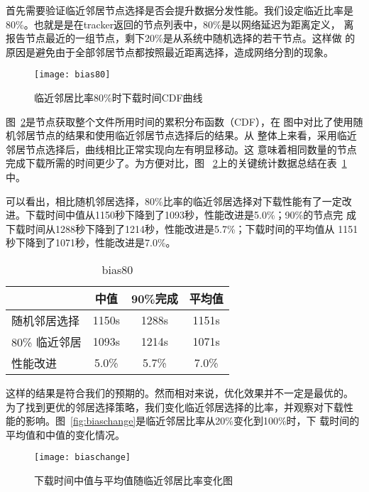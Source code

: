 首先需要验证临近邻居节点选择是否会提升数据分发性能。我们设定临近比率是
80\%。也就是是在tracker返回的节点列表中，80\%是以网络延迟为距离定义，
离报告节点最近的一组节点，剩下20\%是从系统中随机选择的若干节点。这样做
的原因是避免由于全部邻居节点都按照最近距离选择，造成网络分割的现象。

\begin{figure}
  \centering
  \begin{minipage}{0.8\linewidth}
    \centering
    \texttt{[image: bias80]}
    \caption{临近邻居比率80\%时下载时间CDF曲线}
    \label{fig:bias80}
  \end{minipage}
\end{figure}

图~\ref{fig:bias80}是节点获取整个文件所用时间的累积分布函数（CDF），在
图中对比了使用随机邻居节点的结果和使用临近邻居节点选择后的结果。从
整体上来看，采用临近邻居节点选择后，曲线相比正常实现向左有明显移动。这
意味着相同数量的节点完成下载所需的时间更少了。为方便对比，图~
\ref{fig:bias80}上的关键统计数据总结在表~\ref{tbl:bias80}中。

可以看出，相比随机邻居选择，80\%比率的临近邻居选择对下载性能有了一定改
进。下载时间中值从1150秒下降到了1093秒，性能改进是5.0\%；90\%的节点完
成下载时间从1288秒下降到了1214秒，性能改进是5.7\%；下载时间的平均值从
1151秒下降到了1071秒，性能改进是7.0\%。

\begin{table}
\centering
\begin{minipage}{0.8\linewidth}
\centering
\caption{bias80}
\label{tbl:bias80}
\begin{tabular}{lccc}

\toprule[1.5pt]
    & 中值 & 90\%完成 & 平均值\\
\midrule[1pt]
随机邻居选择  & 1150s & 1288s & 1151s\\
80\% 临近邻居 & 1093s & 1214s & 1071s\\
性能改进      & 5.0\% & 5.7\% & 7.0\%\\
\bottomrule[1.5pt]
\end{tabular}
\end{minipage}
\end{table}

这样的结果是符合我们的预期的。然而相对来说，优化效果并不一定是最优的。
为了找到更优的邻居选择策略，我们变化临近邻居选择的比率，并观察对下载性
能的影响。图~\ref{fig:biaschange}是临近邻居比率从20\%变化到100\%时，下
载时间的平均值和中值的变化情况。

\begin{figure}
  \centering
  \begin{minipage}{0.8\linewidth}
    \centering
    \texttt{[image: biaschange]}
    \caption{下载时间中值与平均值随临近邻居比率变化图}
    \label{fig:bias80}
  \end{minipage}
\end{figure}

